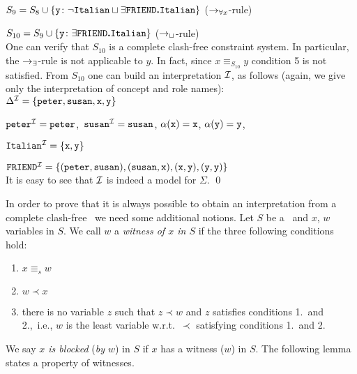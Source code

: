 \begin{example}
$S_9  =  S_8 \cup \{\tt y\colon\neg {\tt Italian}\sqcup\exists FRIEND \mbox{\bf .} {\tt Italian}\}$
                                  ($\rightarrow_{\forall x}$-rule)

$S_{10}  =  S_9 \cup \{\tt y\colon\exists FRIEND \mbox{\bf .} {\tt Italian}\}$
                                  ($\rightarrow_\sqcup$-rule)\\[1.3ex]
%
One can verify that $S_{10}$ is a complete clash-free constraint
system. In particular, the $\rightarrow_\exists$-rule is not applicable to $y$.
In fact, since $x\equiv_{S_{10}} y$ condition 5 is not satisfied.
From $S_{10}$ one can build an interpretation ${\cal I}$, as follows
(again, we give only the interpretation of  concept and role names):\\[1.3ex]
%
\indent
$\Delta^{\cal I} = \{{\tt peter},{\tt susan},{\tt x},{\tt y}\}$

$\tt peter^{\cal I} = {\tt peter}$,~$\tt susan^{\cal I} = {\tt susan}$, $\alpha({\tt x}) = {\tt x}$,
$\alpha({\tt y}) = {\tt y}$,

${\tt Italian}^{\cal I} = \{{\tt x},{\tt y}\}$

$\tt FRIEND^{\cal I}= \{({\tt peter},{\tt susan}),({\tt susan},{\tt x}),({\tt x},{\tt y}),
({\tt y},{\tt y})\}$\\[1.3ex]
%
It is easy to see that ${\cal I}$ is indeed a model for $\Sigma$.
\qed
\end{example}

In order to prove that it is always possible to 
obtain an interpretation from a complete clash-free \cs\ 
we need some additional notions. Let $S$ be a \cs\ and $x$, $w$
variables in $S$. We call $w$ a {\em witness of $x$ in $S$} if
the three following conditions hold:

 \begin{enumerate}
   \item $x\equiv_s w$
   \item $w\prec x$
   \item there is no variable $z$ such that $z\prec w$ and 
         $z$ satisfies conditions 1.\ and 2.,\ i.e., $w$ is the least variable w.r.t.\ 
         $\prec$ satisfying conditions 1.\ and 2. 
 \end{enumerate}
%
We say {\em $x$ is blocked} ({\em by $w$}) in $S$
if $x$ has a witness ($w$) in $S$.
The following lemma states a property of witnesses.

